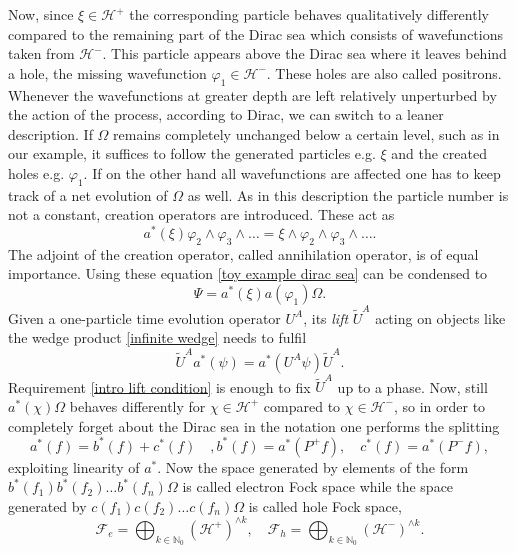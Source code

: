 \documentclass[b5paper,draft,openbib,12pt]{memoir}
\begin{document}
Now, since \(\xi \in \mathcal{H}^+\) the corresponding particle 
behaves qualitatively differently compared to the remaining 
part of the 
Dirac sea which consists of wavefunctions taken from 
\(\mathcal{H}^-\). This particle appears above the Dirac sea
where it leaves behind a hole, the missing wavefunction 
\(\varphi_1\in\mathcal{H}^-\). These holes are also called positrons. 
Whenever the wavefunctions 
at greater depth are left relatively unperturbed by the action 
of the process, according to Dirac, we can switch to a leaner  
description. If \(\Omega\) remains completely unchanged below a 
certain level, such as in our example,  it
suffices to follow the generated particles  
e.g. \(\xi\) and the created holes e.g. \(\varphi_1\). If on the 
other hand all wavefunctions are affected one has to keep track
of a net evolution of \(\Omega\) as well. As in this description
the particle number is not a constant, creation operators 
are introduced. These act as 
\begin{equation}
a^*(\xi)\varphi_2\wedge \varphi_3\wedge\dots = \xi\wedge \varphi_2\wedge \varphi_3\wedge\dots.
\end{equation}
The adjoint of the creation operator, called 
annihilation operator, is of equal importance.  
Using these equation \eqref{toy example dirac sea}
can be condensed to 
\begin{equation}
\Psi= a^*(\xi)a(\varphi_1)\Omega.
\end{equation}
Given a one-particle time evolution operator \(U^A\), its 
\emph{lift} \(\tilde{U}^A\) acting on objects like the 
wedge product \eqref{infinite wedge}
needs to fulfil
\begin{equation}\label{intro lift condition}
\tilde{U}^A a^*(\psi)=a^*(U^A\psi )\tilde{U}^A.
\end{equation}
Requirement \eqref{intro lift condition} is enough to fix 
\(\tilde{U}^A\) up to a phase. Now, still \(a^*(\chi)\Omega\)
behaves differently for \(\chi\in\mathcal{H}^+\) compared to 
\(\chi\in\mathcal{H}^-\), so in order to completely forget 
about the Dirac sea in the notation one performs the splitting 
\begin{equation}
a^*(f)= b^*(f)+ c^*(f) \quad, b^*(f)=a^*(P^+f),\quad c^*(f)=a^*(P^-f),
\end{equation}
exploiting linearity of \(a^*\).  Now the space generated by 
elements of the form \(b^*(f_1)b^*(f_2)\dots b^*(f_n)\Omega\)
is called electron Fock space while the space generated by
\(c(f_1)c(f_2)\dots c(f_n)\Omega\) is called hole 
Fock space,
\begin{equation}
  \mathcal{F}_e= \bigoplus_{k\in\mathbb{N}_0} (\mathcal{H}^+)^{\wedge k},\quad 
  \mathcal{F}_h= \bigoplus_{k\in\mathbb{N}_0} (\mathcal{H}^-)^{\wedge k}.
\end{equation}
\end{document}
